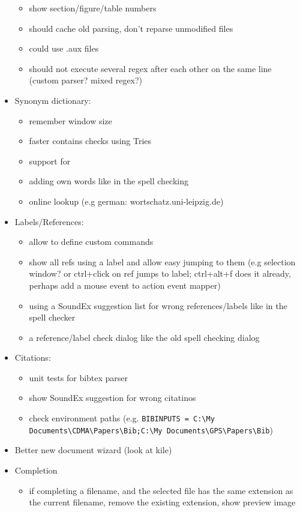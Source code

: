 \documentclass[10pt,a4paper,landscape]{report}
\begin{document}
\begin{itemize}
\begin{itemize}
		\item show section/figure/table numbers
		\item should cache old parsing, don't reparse unmodified files
		\item could use .aux files
		\item should not execute several regex after each other on the same line (custom parser? mixed regex?)	
	\end{itemize}
	\item Synonym dictionary: \begin{itemize}
		\item remember window size
		\item faster contains checks using Tries
		\item support for 
		\item adding own words like in the spell checking 
		\item online lookup (e.g german: wortschatz.uni-leipzig.de)
	\end{itemize}
	\item Labels/References: \begin{itemize}
		\item allow to define custom commands
		\item 	show all refs using a label and allow easy jumping to them (e.g selection window? or ctrl+click on ref jumps to label; ctrl+alt+f does it already, perhaps add a mouse event to action event mapper)
		\item using a SoundEx suggestion list for wrong references/labels like in the spell checker
		\item a reference/label check dialog like the old spell checking dialog
	\end{itemize}
	\item Citations: \begin{itemize}
		\item unit tests for bibtex parser
		\item show SoundEx suggestion for wrong citatinos
		\item check environment paths (e.g. \verb+BIBINPUTS = C:\My Documents\CDMA\Papers\Bib;C:\My Documents\GPS\Papers\Bib+)
	\end{itemize}
	\item Better new document wizard (look at kile)
	\item Completion \begin{itemize}
	\item if completing a filename, and the selected file has the same extension as the current filename, remove the existing extension, show preview image

\end{itemize}
\end{itemize}
\end{document}

